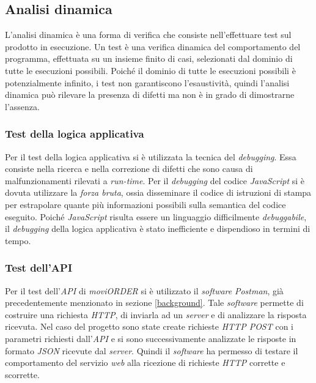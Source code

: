 \subsection{Analisi dinamica}

L'analisi dinamica è una forma di verifica che consiste nell'effettuare test sul prodotto in esecuzione. Un test è una verifica dinamica del comportamento del programma, effettuata su un insieme finito di casi, selezionati dal dominio di tutte le esecuzioni possibili. Poiché il dominio di tutte le esecuzioni possibili è potenzialmente infinito, i test non garantiscono l'esaustività, quindi l'analisi dinamica può rilevare la presenza di difetti ma non è in grado di dimostrarne l'assenza.

\subsubsection{Test della logica applicativa}

Per il test della logica applicativa si è utilizzata la tecnica del \textit{debugging}. Essa consiste nella ricerca e nella correzione di difetti che sono causa di malfunzionamenti rilevati a \textit{run-time}. Per il \textit{debugging} del codice \textit{JavaScript} si è dovuta utilizzare la \textit{forza bruta}, ossia disseminare il codice di istruzioni di stampa per estrapolare quante più informazioni possibili sulla semantica del codice eseguito. Poiché \textit{JavaScript} risulta essere un linguaggio difficilmente \textit{debuggabile}, il \textit{debugging} della logica applicativa è stato inefficiente e dispendioso in termini di tempo.

\subsubsection{Test dell'API}

Per il test dell'\textit{API} di \textit{moviORDER} si è utilizzato il \textit{software} \textit{Postman}, già precedentemente menzionato in sezione \ref{background}. Tale \textit{software} permette di costruire una richiesta \textit{HTTP}, di inviarla ad un \textit{server} e di analizzare la risposta ricevuta. Nel caso del progetto sono state create richieste \textit{HTTP POST} con i parametri richiesti dall'\textit{API} e si sono successivamente analizzate le risposte in formato \textit{JSON} ricevute dal \textit{server}.
Quindi il \textit{software} ha permesso di testare il comportamento del servizio \textit{web} alla ricezione di richieste \textit{HTTP} corrette e scorrette.

